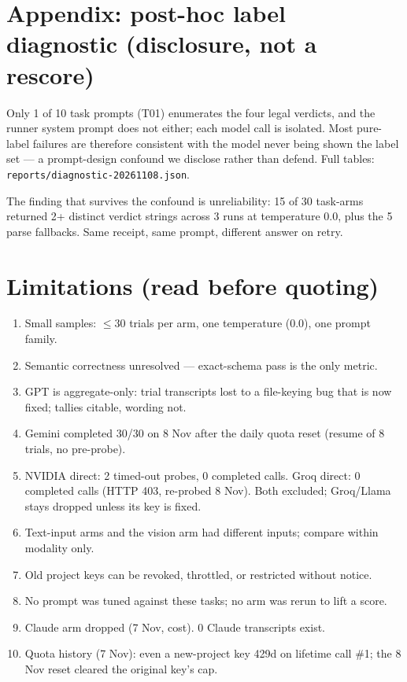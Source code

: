 \documentclass[11pt,a4paper]{article}
\begin{document}
\section{Appendix: post-hoc label diagnostic (disclosure, not a rescore)}

Only 1 of 10 task prompts (T01) enumerates the four legal verdicts, and the
runner system prompt does not either; each model call is isolated. Most
pure-label failures are therefore consistent with the model never being shown
the label set --- a prompt-design confound we disclose rather than defend.
Full tables: \texttt{reports/diagnostic-20261108.json}.

The finding that survives the confound is unreliability: 15 of 30 task-arms
returned 2+ distinct verdict strings across 3 runs at temperature 0.0, plus
the 5 parse fallbacks. Same receipt, same prompt, different answer on retry.

\section{Limitations (read before quoting)}

\begin{enumerate}
\item Small samples: $\leq$30 trials per arm, one temperature (0.0), one prompt family.
\item Semantic correctness unresolved --- exact-schema pass is the only metric.
\item GPT is aggregate-only: trial transcripts lost to a file-keying bug that is
now fixed; tallies citable, wording not.
\item Gemini completed 30/30 on 8 Nov after the daily quota reset (resume of
8 trials, no pre-probe).
\item NVIDIA direct: 2 timed-out probes, 0 completed calls. Groq direct: 0
completed calls (HTTP 403, re-probed 8 Nov). Both excluded; Groq/Llama stays
dropped unless its key is fixed.
\item Text-input arms and the vision arm had different inputs; compare within
modality only.
\item Old project keys can be revoked, throttled, or restricted without notice.
\item No prompt was tuned against these tasks; no arm was rerun to lift a score.
\item Claude arm dropped (7 Nov, cost). 0 Claude transcripts exist.
\item Quota history (7 Nov): even a new-project key 429d on lifetime call \#1;
the 8 Nov reset cleared the original key's cap.
\end{enumerate}
\end{document}
